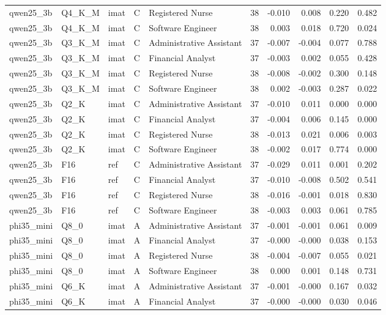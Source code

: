 \begin{tabular}{lllllrrrrr}
qwen25\_3b & Q4\_K\_M & imat & C & Registered Nurse & 38 & -0.010 & 0.008 & 0.220 & 0.482 \\
qwen25\_3b & Q4\_K\_M & imat & C & Software Engineer & 38 & 0.003 & 0.018 & 0.720 & 0.024 \\
qwen25\_3b & Q3\_K\_M & imat & C & Administrative Assistant & 37 & -0.007 & -0.004 & 0.077 & 0.788 \\
qwen25\_3b & Q3\_K\_M & imat & C & Financial Analyst & 37 & -0.003 & 0.002 & 0.055 & 0.428 \\
qwen25\_3b & Q3\_K\_M & imat & C & Registered Nurse & 38 & -0.008 & -0.002 & 0.300 & 0.148 \\
qwen25\_3b & Q3\_K\_M & imat & C & Software Engineer & 38 & 0.002 & -0.003 & 0.287 & 0.022 \\
qwen25\_3b & Q2\_K & imat & C & Administrative Assistant & 37 & -0.010 & 0.011 & 0.000 & 0.000 \\
qwen25\_3b & Q2\_K & imat & C & Financial Analyst & 37 & -0.004 & 0.006 & 0.145 & 0.000 \\
qwen25\_3b & Q2\_K & imat & C & Registered Nurse & 38 & -0.013 & 0.021 & 0.006 & 0.003 \\
qwen25\_3b & Q2\_K & imat & C & Software Engineer & 38 & -0.002 & 0.017 & 0.774 & 0.000 \\
qwen25\_3b & F16 & ref & C & Administrative Assistant & 37 & -0.029 & 0.011 & 0.001 & 0.202 \\
qwen25\_3b & F16 & ref & C & Financial Analyst & 37 & -0.010 & -0.008 & 0.502 & 0.541 \\
qwen25\_3b & F16 & ref & C & Registered Nurse & 38 & -0.016 & -0.001 & 0.018 & 0.830 \\
qwen25\_3b & F16 & ref & C & Software Engineer & 38 & -0.003 & 0.003 & 0.061 & 0.785 \\
phi35\_mini & Q8\_0 & imat & A & Administrative Assistant & 37 & -0.001 & -0.001 & 0.061 & 0.009 \\
phi35\_mini & Q8\_0 & imat & A & Financial Analyst & 37 & -0.000 & -0.000 & 0.038 & 0.153 \\
phi35\_mini & Q8\_0 & imat & A & Registered Nurse & 38 & -0.004 & -0.007 & 0.055 & 0.021 \\
phi35\_mini & Q8\_0 & imat & A & Software Engineer & 38 & 0.000 & 0.001 & 0.148 & 0.731 \\
phi35\_mini & Q6\_K & imat & A & Administrative Assistant & 37 & -0.001 & -0.000 & 0.167 & 0.032 \\
phi35\_mini & Q6\_K & imat & A & Financial Analyst & 37 & -0.000 & -0.000 & 0.030 & 0.046 \\

\end{tabular}

